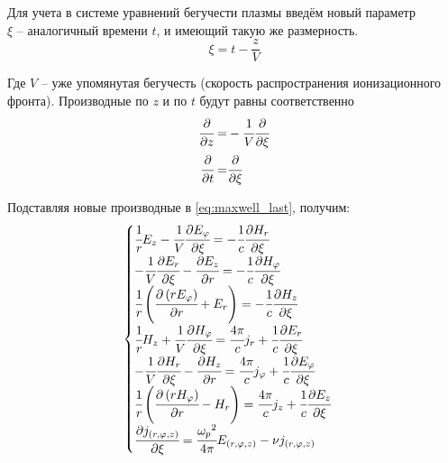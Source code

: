 \documentclass[a4paper]{article}
\begin{document}
Для учета в системе уравнений бегучести плазмы введём новый параметр \\$\xi$ -- аналогичный времени $t$, и имеющий такую же размерность.
\begin{equation}
	\xi=t-\frac{z}{V}
	\label{eq:xi(t-z/V)}
\end{equation}

Где $V$ -- уже упомянутая бегучесть (скорость распространения ионизационного фронта). Производные по $z$ и по $t$ будут равны соответственно 
\begin{eqnarray}
	\cfrac{\partial}{\partial z} =& -\cfrac{1}{V}\cfrac{\partial}{\partial\xi}\\
	\cfrac{\partial}{\partial t} =& \cfrac{\partial}{\partial\xi}
\end{eqnarray}

Подставляя новые производные в \eqref{eq:maxwell_last}, получим:
\begin{equation}
	\begin{cases}		
		\cfrac{1}{r}E_{z}-\cfrac{1}{V}\cfrac{\partial E_{\varphi}}{\partial\xi}=-\cfrac{1}{c}\cfrac{\partial H_{r}}{\partial\xi}\\
		-\cfrac{1}{V}\cfrac{\partial E_{r}}{\partial\xi}-\cfrac{\partial E_{z}}{\partial r}=-\cfrac{1}{c}\cfrac{\partial H_{\varphi}}{\partial\xi}\\
		\cfrac{1}{r}\left(\cfrac{\partial\left(rE_{\varphi}\right)}{\partial r}+E_{r}\right)=-\cfrac{1}{c}\cfrac{\partial H_{z}}{\partial\xi}\\
		\cfrac{1}{r}H_{z}+\cfrac{1}{V}\cfrac{\partial H_{\varphi}}{\partial\xi}=\cfrac{4\pi}{c}j_{r}+\cfrac{1}{c}\cfrac{\partial E_{r}}{\partial\xi}\\
		-\cfrac{1}{V}\cfrac{\partial H_{r}}{\partial\xi}-\cfrac{\partial H_{z}}{\partial r}=\cfrac{4\pi}{c}j_{\varphi}+\cfrac{1}{c}\cfrac{\partial E_{\varphi}}{\partial\xi}\\
		\cfrac{1}{r}\left(\cfrac{\partial\left(rH_{\varphi}\right)}{\partial r}-H_{r}\right)=\cfrac{4\pi}{c}j_{z}+\cfrac{1}{c}\cfrac{\partial E_{z}}{\partial\xi}\\
		\cfrac{\partial{j_{(r,\varphi,z)}}}{\partial\xi}=\cfrac{{\omega_{p}}^{2}}{4\pi}{E_{(r,\varphi,z)}}-\nu{j_{(r,\varphi,z)}}
	\end{cases}
	\label{eq:last}
\end{equation}
\end{document}

